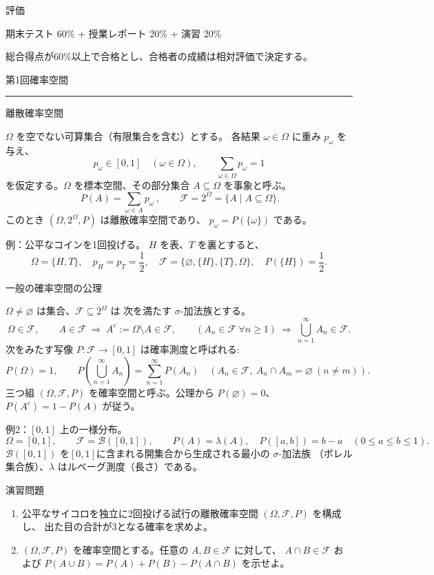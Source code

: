 \documentclass[a4paper,10pt,pdflatex,ja=standard,jafont=ipaex-type1,
  magstyle=real,scale=1]{bxjsarticle}
\newcommand{\topic}[1]{\par\vspace{5pt}
  {\large\sffamily\mdseries\color{accent}#1}\par\vspace{2pt}}
\newcommand{\handouttitle}[1]{%
  \begin{center}
    {\Large\color{ink}#1}\par\vspace{3mm}
    {\color{accent}\rule{0.88\linewidth}{0.7pt}}
  \end{center}\vspace{-2mm}}
\newcommand{\examplelabel}[1]{{\sffamily\mdseries\color{ink}#1}}
\newcommand{\F}{\mathcal F}
\begin{document}
\topic{評価}
期末テスト 60\% + 授業レポート 20\% + 演習 20\%

総合得点が60\%以上で合格とし、合格者の成績は相対評価で決定する。

\newpage
\fontsize{10pt}{13.5pt}\selectfont
\setlength{\abovedisplayskip}{4pt}
\setlength{\belowdisplayskip}{4pt}
\handouttitle{第1回\quad 確率空間}

\topic{離散確率空間}
$\Omega$ を空でない可算集合（有限集合を含む）とする。
各結果 $\omega\in\Omega$ に重み $p_\omega$ を与え、
$$
  p_\omega\in[0,1]\quad(\omega\in\Omega),
  \qquad \sum_{\omega\in\Omega}p_\omega=1
$$
を仮定する。$\Omega$ を標本空間、その部分集合 $A\subseteq\Omega$ を事象と呼ぶ。
$$
{\ P(A)=\sum_{\omega\in A}p_\omega\ },
  \qquad \F=2^\Omega=\{A\mid A\subseteq\Omega\}.
$$
このとき $(\Omega,2^\Omega,P)$ は離散確率空間であり、
$p_\omega=P(\{\omega\})$ である。

\examplelabel{例：公平なコインを1回投げる。}
$H$ を表、$T$ を裏とすると、
$$
  \Omega=\{H,T\},\quad p_H=p_T=\frac12,\quad
  \F=\{\varnothing,\{H\},\{T\},\Omega\},\quad P(\{H\})=\frac12.
$$

\topic{一般の確率空間の公理}
$\Omega\ne\varnothing$ は集合、$\F\subseteq2^\Omega$ は
次を満たす $\sigma$-加法族とする。
$$
  \Omega\in\F,\qquad
  A\in\F\ \Longrightarrow\ A^c:=\Omega\setminus A\in\F,\qquad
  (A_n\in\F\ \forall n\ge1)\ \Longrightarrow\
  \bigcup_{n=1}^\infty A_n\in\F.
$$
次をみたす写像 $P:\F\to[0,1]$ は確率測度と呼ばれる:
$$
  P(\Omega)=1,\qquad
  P\!\left(\bigcup_{n=1}^\infty A_n\right)
    =\sum_{n=1}^\infty P(A_n)
  \quad\left(A_n\in\F,\ A_n\cap A_m=\varnothing\ (n\ne m)\right).
$$
三つ組 $(\Omega,\F,P)$ を確率空間と呼ぶ。公理から $P(\varnothing)=0$、$P(A^c)=1-P(A)$ が従う。

\examplelabel{例2：$[0,1]$ 上の一様分布。}
$$
  \Omega=[0,1],\qquad \F=\mathcal B([0,1]),\qquad
  P(A)=\lambda(A),\quad P([a,b])=b-a\quad(0\le a\le b\le1).
$$
$\mathcal B([0,1])$ を$[0,1]$に含まれる開集合から生成される最小の $\sigma$-加法族
（ボレル集合族）、$\lambda$ はルベーグ測度（長さ）である。


\topic{演習問題}
\begin{enumerate}[label=\arabic*.]
  \item 公平なサイコロを独立に2回投げる試行の離散確率空間 $(\Omega,\F,P)$ を構成し、
  出た目の合計が3となる確率を求めよ。
  \item $(\Omega,\F,P)$ を確率空間とする。任意の $A,B\in\F$ に対して、
  $A\cap B\in\F$ および $P(A\cup B)=P(A)+P(B)-P(A\cap B)$ を示せよ。
\end{enumerate}
\end{document}
